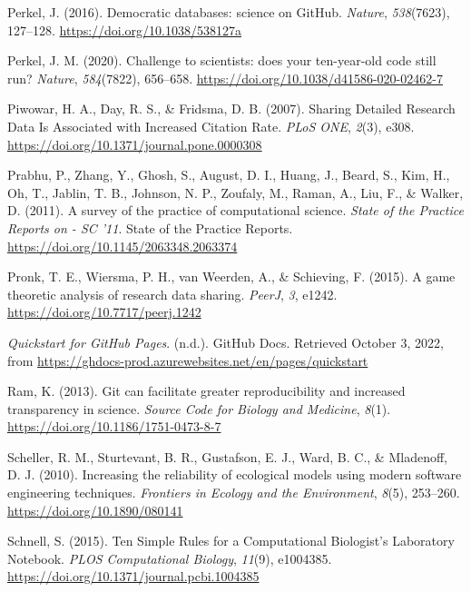 \begin{CSLReferences}{1}{0}
\leavevmode{}%
Perkel, J. (2016). Democratic databases: science on GitHub. \emph{Nature}, \emph{538}(7623), 127--128. \url{https://doi.org/10.1038/538127a}

\leavevmode{}%
Perkel, J. M. (2020). Challenge to scientists: does your ten-year-old code still run? \emph{Nature}, \emph{584}(7822), 656--658. \url{https://doi.org/10.1038/d41586-020-02462-7}

\leavevmode{}%
Piwowar, H. A., Day, R. S., \& Fridsma, D. B. (2007). Sharing Detailed Research Data Is Associated with Increased Citation Rate. \emph{PLoS ONE}, \emph{2}(3), e308. \url{https://doi.org/10.1371/journal.pone.0000308}

\leavevmode{}%
Prabhu, P., Zhang, Y., Ghosh, S., August, D. I., Huang, J., Beard, S., Kim, H., Oh, T., Jablin, T. B., Johnson, N. P., Zoufaly, M., Raman, A., Liu, F., \& Walker, D. (2011). A survey of the practice of computational science. \emph{State of the Practice Reports on - SC '11}. State of the Practice Reports. \url{https://doi.org/10.1145/2063348.2063374}

\leavevmode{}%
Pronk, T. E., Wiersma, P. H., van Weerden, A., \& Schieving, F. (2015). A game theoretic analysis of research data sharing. \emph{PeerJ}, \emph{3}, e1242. \url{https://doi.org/10.7717/peerj.1242}

\leavevmode{}%
\emph{Quickstart for GitHub Pages}. (n.d.). GitHub Docs. Retrieved October 3, 2022, from \url{https://ghdocs-prod.azurewebsites.net/en/pages/quickstart}

\leavevmode{}%
Ram, K. (2013). Git can facilitate greater reproducibility and increased transparency in science. \emph{Source Code for Biology and Medicine}, \emph{8}(1). \url{https://doi.org/10.1186/1751-0473-8-7}

\leavevmode{}%
Scheller, R. M., Sturtevant, B. R., Gustafson, E. J., Ward, B. C., \& Mladenoff, D. J. (2010). Increasing the reliability of ecological models using modern software engineering techniques. \emph{Frontiers in Ecology and the Environment}, \emph{8}(5), 253--260. \url{https://doi.org/10.1890/080141}

\leavevmode{}%
Schnell, S. (2015). Ten Simple Rules for a Computational Biologist's Laboratory Notebook. \emph{PLOS Computational Biology}, \emph{11}(9), e1004385. \url{https://doi.org/10.1371/journal.pcbi.1004385}


\end{CSLReferences}
